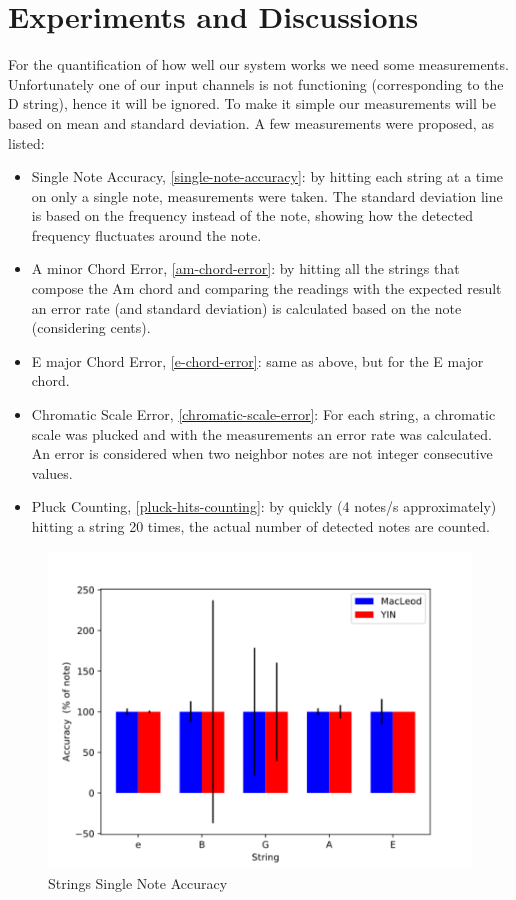 \chapter{Experiments and Discussions}
For the quantification of how well our system works we need some measurements.
Unfortunately one of our input channels is not functioning (corresponding to the
D string), hence it will be ignored.
To make it simple our measurements will be based on mean and standard deviation.
A few measurements were proposed, as listed:

\begin{itemize}
  \item Single Note Accuracy, \autoref{single-note-accuracy}: by hitting each string
  at a time on only a single note, measurements were taken. The standard deviation line is based on the
  frequency instead of the note, showing how the detected frequency fluctuates around
  the note.
  \item A minor Chord Error, \autoref{am-chord-error}: by hitting all the strings that compose
  the Am chord and comparing the readings with the expected result an error rate (and standard
  deviation) is calculated based on the note (considering cents).
  \item E major Chord Error, \autoref{e-chord-error}: same as above, but for the E major chord.
  \item Chromatic Scale Error, \autoref{chromatic-scale-error}: For each string, a chromatic
  scale was plucked and with the measurements an error rate was calculated. An error is considered
  when two neighbor notes are not integer consecutive values.
  \item Pluck Counting, \autoref{pluck-hits-counting}: by quickly (4 notes/s approximately) hitting
  a string 20 times, the actual number of detected notes are counted.
\end{itemize}

\begin{figure}[!htpb]
  \centering
  \caption{Strings Single Note Accuracy}
  \label{single-note-accuracy}
  \includegraphics[scale=0.85]{images/measurements/single-note-accuracy}
\end{figure}

